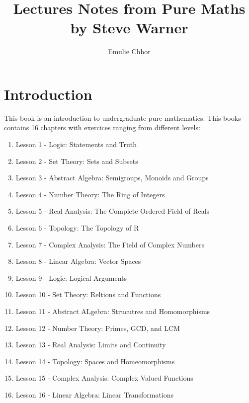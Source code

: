 \documentclass{article}
\begin{document}
\title{Lectures Notes from Pure Maths by Steve Warner}
\author{Emulie Chhor}
\maketitle

\section*{Introduction}

This book is an introduction to undergraduate pure mathematics. This books contains
16 chapters with exercices ranging from different levels:

\begin{enumerate}
    \item Lesson 1 - Logic: Statements and Truth
    \item Lesson 2 - Set Theory: Sets and Subsets
    \item Lesson 3 - Abstract Algebra: Semigroups, Monoids and Groups
    \item Lesson 4 - Number Theory: The Ring of Integers
    \item Lesson 5 - Real Analysis: The Complete Ordered Field of Reals
    \item Lesson 6 - Topology: The Topology of R
    \item Lesson 7 - Complex Analysis: The Field of Complex Numbers
    \item Lesson 8 - Linear Algebra: Vector Spaces
    \item Lesson 9 - Logic: Logical Arguments
    \item Lesson 10 - Set Theory: Reltions and Functions
    \item Lesson 11 - Abstract ALgebra: Strucutres and Homomorphisms
    \item Lesson 12 - Number Theory: Primes, GCD, and LCM
    \item Lesson 13 - Real Analysis: Limits and Continuity
    \item Lesson 14 - Topology: Spaces and Homeomorphisms
    \item Lesson 15 - Complex Analysis: Complex Valued Functions
    \item Lesson 16 - Linear Algebra: Linear Transformations
\end{enumerate}

\pagebreak

\newtheorem{definition}{Definition}[subsection]
\newtheorem{theorem}{Theorem}[subsection]
\newtheorem{corollary}{Corollary}[subsection]
\newtheorem{lemma}[theorem]{Lemma}
\newtheorem*{remark}{Remark}
\newtheorem*{proposition}{Proposition}
\end{document}
